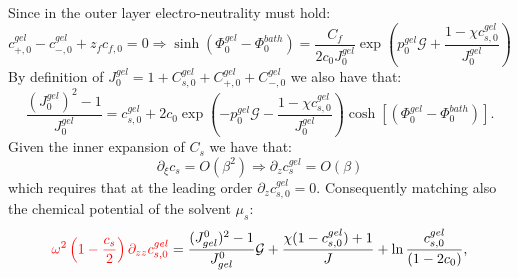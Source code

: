 \documentclass[12pt]{extarticle}
\begin{document}
Since in the outer layer electro-neutrality must hold:
\begin{equation}
c^{gel}_{+,0}-c^{gel}_{-,0}+z_fc_{f,0} =0 \Rightarrow  \sinh(\Phi_0^{gel}-\Phi_0^{bath})= \frac{C_f}{2c_0 J_0^{gel}}\exp\left(p_0^{gel}\mathcal{G}+\frac{1-\chi c^{gel}_{s,0}}{J^{gel}_0}\right)\label{eq2}
\end{equation}
By definition of $J^{gel}_0=1+C^{gel}_{s,0}+C^{gel}_{+,0}+C^{gel}_{-,0}$ we also have that:
\begin{equation}
\frac{(J^{gel}_0)^2-1}{J^{gel}_0}=c^{gel}_{s,0}+ 2c_0\exp\left(-p_0^{gel}\mathcal{G}-\frac{1-\chi c^{gel}_{s,0}}{J^{gel}_0}\right)\cosh[(\Phi^{gel}_0-\Phi_0^{bath})]\label{eq3}.
\end{equation}
Given the inner expansion of $C_s$ we have that:
\begin{equation}
\partial_\xi c_s = O(\beta^2) \Rightarrow \partial_z c^{gel}_{s} = O(\beta)
\end{equation}
which requires that at the leading order $\partial_z c^{gel}_{s,0} = 0$.
Consequently matching also the chemical potential of the solvent $\mu_s$:
\begin{equation}
\begin{aligned}
\color{red}\omega^2\left(1-\frac{c_s}{2}\right) \partial_{zz}c^{gel}_{s,0}\color{black}= \frac{(J^0_{gel})^2-1}{J^0_{gel}} \mathcal{G} +\frac{\chi(1-c^{gel}_{s,0})+1}{J} + \ln \frac{c^{gel}_{s,0}}{(1-2c_0)}, 
\end{aligned}\\[2.5mm]\label{eq4}
\end{equation}
\end{document}
